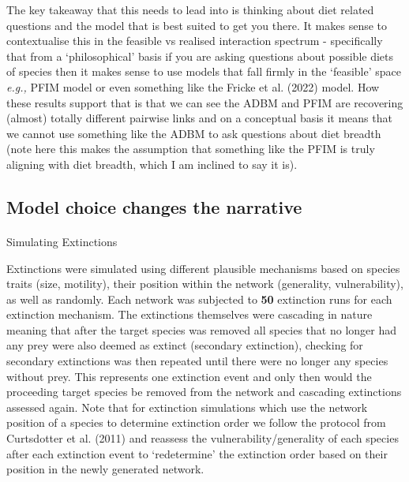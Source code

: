 \documentclass[
]{article}
\makeatletter
\let\oldparagraph\paragraph
\renewcommand{\paragraph}{
    \@ifstar
      \xxxParagraphStar
      \xxxParagraphNoStar
  }
\newcommand{\xxxParagraphStar}[1]{\oldparagraph*{#1}\mbox{}}
\newcommand{\xxxParagraphNoStar}[1]{\oldparagraph{#1}\mbox{}}
\makeatother
\begin{document}
The key takeaway that this needs to lead into is thinking about diet
related questions and the model that is best suited to get you there. It
makes sense to contextualise this in the feasible vs realised
interaction spectrum - specifically that from a `philosophical' basis if
you are asking questions about possible diets of species then it makes
sense to use models that fall firmly in the `feasible' space
\emph{e.g.,} PFIM model or even something like the Fricke et al. (2022)
model. How these results support that is that we can see the ADBM and
PFIM are recovering (almost) totally different pairwise links and on a
conceptual basis it means that we cannot use something like the ADBM to
ask questions about diet breadth (note here this makes the assumption
that something like the PFIM is truly aligning with diet breadth, which
I am inclined to say it is).

\subsection{Model choice changes the
narrative}\label{model-choice-changes-the-narrative}

\paragraph{Simulating Extinctions}\label{simulating-extinctions}

Extinctions were simulated using different plausible mechanisms based on
species traits (size, motility), their position within the network
(generality, vulnerability), as well as randomly. Each network was
subjected to \textbf{50} extinction runs for each extinction mechanism.
The extinctions themselves were cascading in nature meaning that after
the target species was removed all species that no longer had any prey
were also deemed as extinct (secondary extinction), checking for
secondary extinctions was then repeated until there were no longer any
species without prey. This represents one extinction event and only then
would the proceeding target species be removed from the network and
cascading extinctions assessed again. Note that for extinction
simulations which use the network position of a species to determine
extinction order we follow the protocol from Curtsdotter et al. (2011)
and reassess the vulnerability/generality of each species after each
extinction event to `redetermine' the extinction order based on their
position in the newly generated network.
\end{document}
